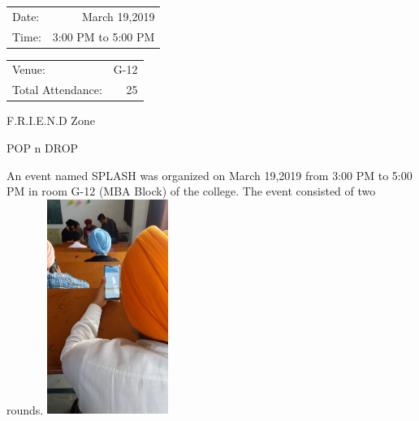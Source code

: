 \documentclass[12pt, a4 paper]{article}
\begin{document}
\begin{center}
\begin{multicols}{2}
\begin{tabular}{l r}
Date: & March 19,2019\\ %
Time: & 3:00 PM to 5:00 PM \\ %
\end{tabular}
\columnbreak
\begin{tabular}{l r}
Venue: & G-12 \\ %
Total Attendance: & 25 \\ %
\end{tabular}
\end{multicols}


\begin{Large}
\begin{multicols}{2}
F.R.I.E.N.D Zone 
\columnbreak

POP n DROP
\end{multicols}
\end{Large}


\begin{Large}
\begin{multicols}{2}
 An event named SPLASH was organized on March 19,2019 from 3:00 PM to 5:00 PM in room G-12 (MBA Block) of the college. The event consisted of two rounds.
\columnbreak
\includegraphics[width=5.cm , height=7cm]{image1.png}
\end{multicols}

\newpage


\end{Large}
\end{center}
\end{document}
